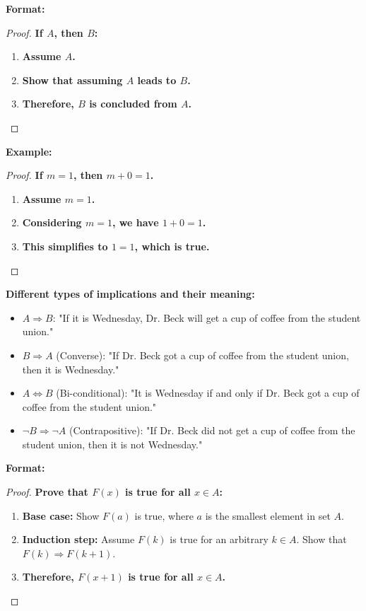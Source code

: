 
\textbf{Format:}
\begin{proof}
\textbf{If \(A\), then \(B\):}
\begin{enumerate}
    \item \textbf{Assume \(A\).}
    \item \textbf{Show that assuming \(A\) leads to \(B\).}
    \item \textbf{Therefore, \(B\) is concluded from \(A\).}
\end{enumerate}
\end{proof}

\textbf{Example:}
\begin{proof}
\textbf{If \(m = 1\), then \(m + 0 = 1\).}
\begin{enumerate}
    \item \textbf{Assume \(m = 1\).}
    \item \textbf{Considering \(m = 1\), we have \(1 + 0 = 1\).}
    \item \textbf{This simplifies to \(1 = 1\), which is true.}
\end{enumerate}
\end{proof}


\textbf{Different types of implications and their meaning:}
\begin{itemize}
    \item \textbf{\(A \Rightarrow B\)}: "If it is Wednesday, Dr. Beck will get a cup of coffee from the student union."
    \item \textbf{\(B \Rightarrow A\)} (Converse): "If Dr. Beck got a cup of coffee from the student union, then it is Wednesday."
    \item \textbf{\(A \Leftrightarrow B\)} (Bi-conditional): "It is Wednesday if and only if Dr. Beck got a cup of coffee from the student union."
    \item \textbf{\(\neg B \Rightarrow \neg A\)} (Contrapositive): "If Dr. Beck did not get a cup of coffee from the student union, then it is not Wednesday."
\end{itemize}


\textbf{Format:}
\begin{proof}
\textbf{Prove that \(F(x)\) is true for all \(x \in A\):}
\begin{enumerate}
    \item \textbf{Base case:} Show \(F(a)\) is true, where \(a\) is the smallest element in set \(A\).
    \item \textbf{Induction step:} Assume \(F(k)\) is true for an arbitrary \(k \in A\). Show that \(F(k) \Rightarrow F(k+1)\).
    \item \textbf{Therefore, \(F(x+1)\) is true for all \(x \in A\).}
\end{enumerate}
\end{proof}

